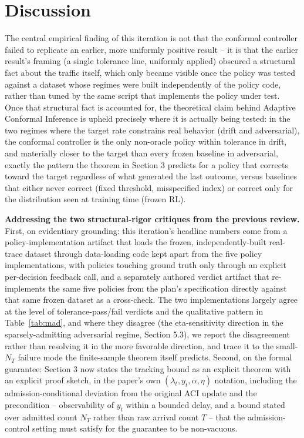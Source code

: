 \documentclass[11pt,letterpaper]{article}
\begin{document}
\section{Discussion}

The central empirical finding of this iteration is not that the conformal controller failed to replicate an earlier, more uniformly positive result -- it is that the earlier result's framing (a single tolerance line, uniformly applied) obscured a structural fact about the traffic itself, which only became visible once the policy was tested against a dataset whose regimes were built independently of the policy code, rather than tuned by the same script that implements the policy under test. Once that structural fact is accounted for, the theoretical claim behind Adaptive Conformal Inference \citep{Gibbs2021} is upheld precisely where it is actually being tested: in the two regimes where the target rate constrains real behavior (drift and adversarial), the conformal controller is the only non-oracle policy within tolerance in drift, and materially closer to the target than every frozen baseline in adversarial, exactly the pattern the theorem in Section 3 predicts for a policy that corrects toward the target regardless of what generated the last outcome, versus baselines that either never correct (fixed threshold, misspecified index) or correct only for the distribution seen at training time (frozen RL).

\textbf{Addressing the two structural-rigor critiques from the previous review.} First, on evidentiary grounding: this iteration's headline numbers come from a policy-implementation artifact that loads the frozen, independently-built real-trace dataset through data-loading code kept apart from the five policy implementations, with policies touching ground truth only through an explicit per-decision feedback call, and a separately authored verdict artifact that re-implements the same five policies from the plan's specification directly against that same frozen dataset as a cross-check. The two implementations largely agree at the level of tolerance-pass/fail verdicts and the qualitative pattern in Table~\ref{tab:mad}, and where they disagree (the eta-sensitivity direction in the sparsely-admitting adversarial regime, Section 5.3), we report the disagreement rather than resolving it in the more favorable direction, and trace it to the small-$N_T$ failure mode the finite-sample theorem itself predicts. Second, on the formal guarantee: Section 3 now states the tracking bound as an explicit theorem with an explicit proof sketch, in the paper's own $(\lambda_t, y_t, \alpha, \eta)$ notation, including the admission-conditional deviation from the original ACI update and the precondition -- observability of $y_t$ within a bounded delay, and a bound stated over admitted count $N_T$ rather than raw arrival count $T$ -- that the admission-control setting must satisfy for the guarantee to be non-vacuous.
\end{document}
